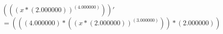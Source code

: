 \documentclass[a4paper, 12 pt]{article}
\begin{document}
	$\left(((x*\left(2.000000\right))^{\left(4.000000\right)})\right)'$
	$= ((\left(4.000000\right)*((x*\left(2.000000\right))^{\left(3.000000\right)}))*\left(2.000000\right))$
\end{document}
